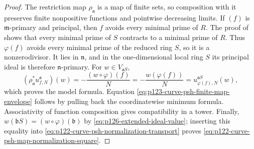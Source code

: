 \begin{proof}
The restriction map \(\rho_{\mathfrak a}\) is a map of finite sets, so
composition with it preserves finite nonpositive functions and pointwise
decreasing limits.  If \((f)\) is \(\mathfrak m\)-primary and principal,
then \(f\) avoids every minimal prime of \(R\).  The proof of
 shows that every minimal prime
of \(S\) contracts to a minimal prime of \(R\).  Thus \(\varphi(f)\)
avoids every minimal prime of the reduced ring \(S\), so it is a
nonzerodivisor.  It lies in \(\mathfrak n\), and in the one-dimensional
local ring \(S\) its principal ideal is therefore \(\mathfrak n\)-primary.
For \(w\in V_{\mathfrak aS}\),
\[
 (\rho_{\mathfrak a}^*u^{\mathfrak a}_{f,N})(w)
       =-\frac{(w\circ\varphi)(f)}N
       =-\frac{w(\varphi(f))}N
       =u^{\mathfrak aS}_{\varphi(f),N}(w),
\]
which proves the model formula.  Equation
\eqref{eq:p123-curve-psh-finite-map-envelope} follows by pulling back the
coordinatewise minimum formula.  Associativity of function composition
gives compatibility in a tower.  Finally,
\(w(\mathfrak bS)=(w\circ\varphi)(\mathfrak b)\) by
\eqref{eq:p126-extended-ideal-value}; inserting this equality into
\eqref{eq:p122-curve-psh-normalization-transport} proves
\eqref{eq:p122-curve-psh-map-normalization-square}.


\end{proof}
